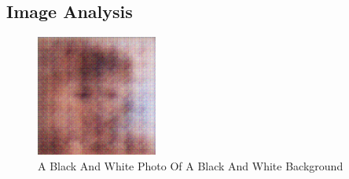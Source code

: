 \documentclass{article}%
\begin{document}
%
\subsection{Image Analysis}%
\label{subsec:ImageAnalysis}%


\begin{figure}[h!]%
\centering%
\includegraphics[width=150px]{500_fake_images/samples_5_256.png}%
\caption{A Black And White Photo Of A Black And White Background}%
\end{figure}

%
\end{document}
